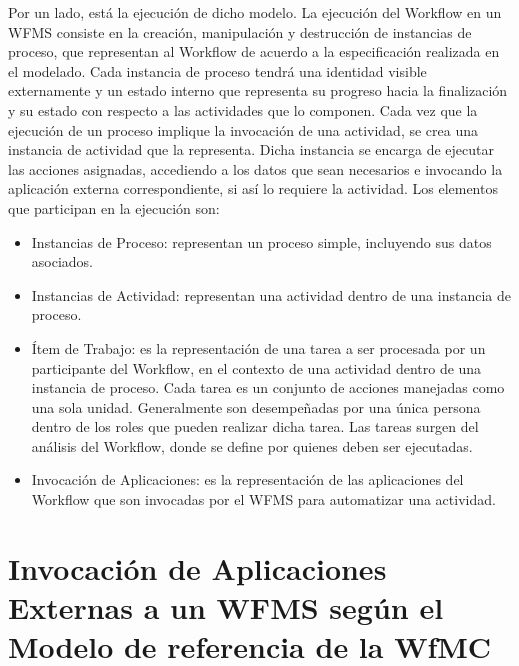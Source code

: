 Por un lado, está la ejecución de dicho modelo. La ejecución del Workflow en un WFMS consiste en la creación, manipulación y destrucción de instancias de proceso, que representan al Workflow de acuerdo a la especificación realizada en el modelado. Cada instancia de proceso tendrá una identidad visible externamente y un estado interno que representa su progreso hacia la finalización y su estado con respecto a las actividades que lo componen. Cada vez que la ejecución de un proceso implique la invocación de una actividad, se crea una instancia de actividad que la representa. Dicha instancia se encarga de ejecutar las acciones asignadas, accediendo a los datos que sean necesarios e invocando la aplicación externa correspondiente, si así lo requiere la actividad. Los elementos que participan en la ejecución son:

\begin{itemize}
	\item Instancias de Proceso: representan un proceso simple, incluyendo sus datos asociados.
	
	\item Instancias de Actividad: representan una actividad dentro de una instancia de proceso.
	
	\item Ítem de Trabajo: es la representación de una tarea a ser procesada por un participante del Workflow, en el contexto de una actividad dentro de una instancia de proceso. Cada tarea es un conjunto de acciones manejadas como una sola unidad. Generalmente son desempeñadas por una única persona dentro de los roles que pueden realizar dicha tarea. Las tareas surgen del análisis del Workflow, donde se define por quienes deben ser ejecutadas.
	
	\item Invocación de Aplicaciones: es la representación de las aplicaciones del Workflow que son invocadas por el WFMS para automatizar una actividad.
\end{itemize}

\section{Invocación de Aplicaciones Externas a un WFMS según el Modelo de referencia de la WfMC}
\label{Invocación de Aplicaciones Externas a un WFMS según el Modelo de referencia de la WfMC}

